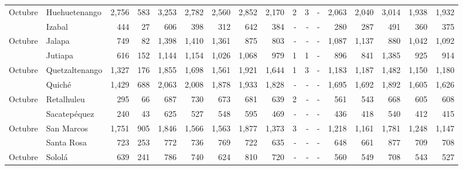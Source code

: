 \begin{landscape}
\begin{center}
\begin{longtable}{llrrrrrrrrrrrrrrr}
			\multicolumn{1}{l}{	\footnotesize	 Octubre 	}&	 Huehuetenango 	&	 2,756 	&	 583 	&	 3,253 	&	 2,782 	&	 2,560 	&	 2,852 	&	 2,170 	&	 2 	&	 3 	&	 -   	&	 2,063 	&	 2,040 	&	 3,014 	&	 1,938 	&	 1,932 	\\
			\rowcolor{color1!5!white}\multicolumn{1}{l}{	\footnotesize	 Octubre 	}&	 Izabal 	&	 444 	&	 27 	&	 606 	&	 398 	&	 312 	&	 642 	&	 384 	&	 -   	&	 -   	&	 -   	&	 280 	&	 287 	&	 491 	&	 360 	&	 375 	\\
			\multicolumn{1}{l}{	\footnotesize	 Octubre 	}&	 Jalapa 	&	 749 	&	 82 	&	 1,398 	&	 1,410 	&	 1,361 	&	 875 	&	 803 	&	 -   	&	 -   	&	 -   	&	 1,087 	&	 1,137 	&	 880 	&	 1,042 	&	 1,092 	\\
			\rowcolor{color1!5!white}\multicolumn{1}{l}{	\footnotesize	 Octubre 	}&	 Jutiapa 	&	 616 	&	 152 	&	 1,144 	&	 1,154 	&	 1,026 	&	 1,068 	&	 979 	&	 1 	&	 1 	&	 -   	&	 896 	&	 841 	&	 1,385 	&	 925 	&	 914 	\\
			\multicolumn{1}{l}{	\footnotesize	 Octubre 	}&	 Quetzaltenango 	&	 1,327 	&	 176 	&	 1,855 	&	 1,698 	&	 1,561 	&	 1,921 	&	 1,644 	&	 1 	&	 3 	&	 -   	&	 1,183 	&	 1,187 	&	 1,482 	&	 1,150 	&	 1,180 	\\
			\rowcolor{color1!5!white}\multicolumn{1}{l}{	\footnotesize	 Octubre 	}&	 Quiché 	&	 1,429 	&	 688 	&	 2,063 	&	 2,008 	&	 1,878 	&	 1,933 	&	 1,828 	&	 -   	&	 -   	&	 -   	&	 1,695 	&	 1,692 	&	 1,892 	&	 1,605 	&	 1,626 	\\
			\multicolumn{1}{l}{	\footnotesize	 Octubre 	}&	 Retalhuleu 	&	 295 	&	 66 	&	 687 	&	 730 	&	 673 	&	 681 	&	 639 	&	 2 	&	 -   	&	 -   	&	 561 	&	 543 	&	 668 	&	 605 	&	 608 	\\
			\rowcolor{color1!5!white}\multicolumn{1}{l}{	\footnotesize	 Octubre 	}&	 Sacatepéquez 	&	 240 	&	 43 	&	 625 	&	 527 	&	 548 	&	 595 	&	 469 	&	 -   	&	 -   	&	 -   	&	 436 	&	 418 	&	 540 	&	 412 	&	 415 	\\
			\multicolumn{1}{l}{	\footnotesize	 Octubre 	}&	 San Marcos 	&	 1,751 	&	 905 	&	 1,846 	&	 1,566 	&	 1,563 	&	 1,877 	&	 1,373 	&	 3 	&	 -   	&	 -   	&	 1,218 	&	 1,161 	&	 1,781 	&	 1,248 	&	 1,147 	\\
			\rowcolor{color1!5!white}\multicolumn{1}{l}{	\footnotesize	 Octubre 	}&	 Santa Rosa 	&	 723 	&	 253 	&	 772 	&	 736 	&	 769 	&	 722 	&	 635 	&	 -   	&	 -   	&	 -   	&	 648 	&	 661 	&	 877 	&	 709 	&	 708 	\\
			\multicolumn{1}{l}{	\footnotesize	 Octubre 	}&	 Sololá 	&	 639 	&	 241 	&	 786 	&	 740 	&	 624 	&	 810 	&	 720 	&	 -   	&	 -   	&	 -   	&	 560 	&	 549 	&	 708 	&	 543 	&	 527 	\\

\end{longtable}
\end{center}
\end{landscape}
